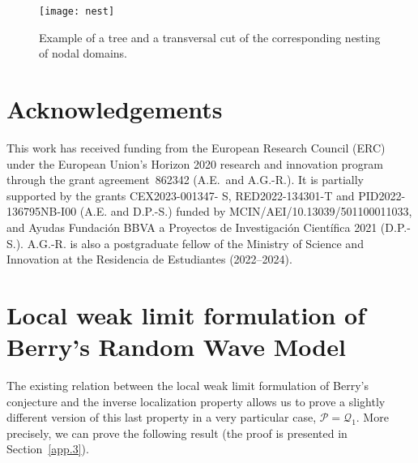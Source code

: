 \documentclass{amsart}
\theoremstyle{definition}
\theoremstyle{remark}
\numberwithin{equation}{section}
\theoremstyle{definition}
\theoremstyle{remark}
\begin{document}
\begin{figure}\renewcommand\thefigure{7.1}
    \texttt{[image: nest]}
	\caption{Example of a tree and a transversal cut of the corresponding
nesting of nodal domains.}
\end{figure}

\section*{Acknowledgements}
This work has received funding from the European Research Council (ERC) under the European Union's Horizon 2020 research and innovation program through the grant agreement~862342 (A.E.\ and A.G.-R.). It is partially supported by the grants CEX2023-001347-
S, RED2022-134301-T and PID2022-136795NB-I00 (A.E. and D.P.-S.) funded by
MCIN/AEI/10.13039/501100011033, and Ayudas Fundación BBVA a Proyectos de
Investigación Científica 2021 (D.P.-S.). A.G.-R. is also a postgraduate fellow of the Ministry of Science and Innovation at the Residencia de Estudiantes (2022–2024).
\appendix

\section{Local weak limit formulation of Berry's Random Wave Model}\label{AppendixA}
The existing relation between the local weak limit formulation of Berry's conjecture and the inverse localization property allows us to prove a slightly different version of this last property in a very particular case, $\mathcal{P}=\mathcal{Q}_1$. More precisely, we can prove the following result (the proof is presented in Section~\ref{app.3}).
\end{document}
